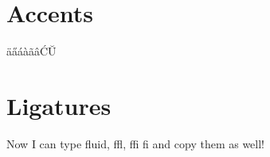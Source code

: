 \documentclass[10pt]{article}
\begin{document}
\section{Accents}

\"{a}\H{a}\'{a}\`{a}\~{a}\^{a}\'{C}\u{U}

\section{Ligatures}



Now I can type fluid, ffl, ffi fi and copy them as well!
\end{document}
